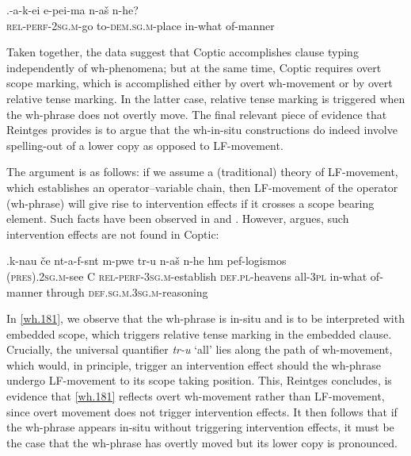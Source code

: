 \documentclass[charis]{glossa}
\begin{document}
\exg.\label{wh.180}{\textschwa}-a-k-ei e-pei-ma {\textschwa}n-a\v{s} {\textschwa}n-he?\\
   \textsc{rel-perf-2sg.m}-go to-\textsc{dem.sg.m}-place in-what of-manner\\

Taken together, the data suggest that Coptic accomplishes clause typing independently of wh-phenomena; but at the same time, Coptic requires overt scope marking, which is accomplished either by overt wh-movement or by overt relative tense marking. In the latter case, relative tense marking is triggered when the wh-phrase does not overtly move. The final relevant piece of evidence that Reintges provides is to argue that the wh-in-situ constructions do indeed involve spelling-out of a lower copy as opposed to LF-movement.

The argument is as follows: if we assume a (traditional) theory of LF-movement, which establishes an operator--variable chain, then LF-movement of the operator (wh-phrase) will give rise to intervention effects if it crosses a scope bearing element. Such facts have been observed in \cite{beck:1996} and \cite{beck-kim:1997}. However, \cite{reintges:2007} argues, such intervention effects are not found in Coptic:

\exg.\label{wh.181}k-nau \v{c}e {\textschwa}nt-a-f-s{\textschwa}nt {\textschwa}m-p{\textepsilon}we t{\textepsilon}r-u {\textschwa}n-a\v{s} {\textschwa}n-he h{\textschwa}m pef-logismos\\
   \textsc{(pres).2sg.m}-see C \textsc{rel-perf-3sg.m}-establish \textsc{def.pl}-heavens all-\textsc{3pl} in-what of-manner through \textsc{def.sg.m.3sg.m}-reasoning\\

In \ref{wh.181}, we observe that the wh-phrase is in-situ and is to be interpreted with embedded scope, which triggers relative tense marking in the embedded clause. Crucially, the universal quantifier \textit{t\textepsilon r-u} `all' lies along the path of wh-movement, which would, in principle, trigger an intervention effect should the wh-phrase undergo LF-movement to its scope taking position. This, Reintges concludes, is evidence that \ref{wh.181} reflects overt wh-movement rather than LF-movement, since overt movement does not trigger intervention effects. It then follows that if the wh-phrase appears in-situ without triggering intervention effects, it must be the case that the wh-phrase has overtly moved but its lower copy is pronounced.
\end{document}
